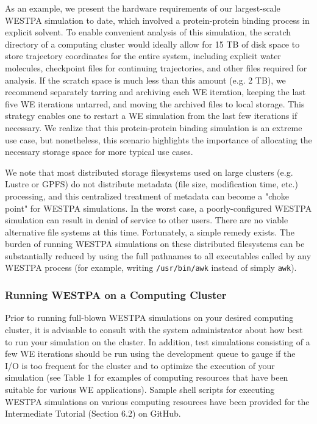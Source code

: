 \documentclass[9pt,tutorial,pubversion]{livecoms}
\begin{document}
As an example, we present the hardware requirements of our largest-scale WESTPA simulation to date, which involved a protein-protein binding process in explicit solvent. 
To enable convenient analysis of this simulation, the scratch directory of a computing cluster would ideally allow for 15 TB of disk space to store trajectory coordinates for the entire system, including explicit water molecules, checkpoint files for continuing trajectories, and other files required for analysis. 
If the scratch space is much less than this amount (e.g. 2 TB), we recommend separately tarring and archiving each WE iteration, keeping the last five WE iterations untarred, and moving the archived files to local storage. 
This strategy enables one to restart a WE simulation from the last few iterations if necessary. 
We realize that this protein-protein binding simulation is an extreme use case, but nonetheless, this scenario highlights the importance of allocating the necessary storage space for more typical use cases. 

We note that most distributed storage filesystems used on large clusters (e.g. Lustre or GPFS) do not distribute metadata (file size, modification time, etc.) processing, and this centralized treatment of metadata can become a "choke point" for WESTPA simulations. 
In the worst case, a poorly-configured WESTPA simulation can result in denial of service to other users. 
There are no viable alternative file systems at this time. 
Fortunately, a simple remedy exists. The burden of running WESTPA simulations on these distributed filesystems can be substantially reduced by using the full pathnames to all executables called by any WESTPA process (for example, writing \verb|/usr/bin/awk| instead of simply \verb|awk|).

\subsubsection{Running WESTPA on a Computing Cluster}

Prior to running full-blown WESTPA simulations on your desired computing cluster, it is advisable to consult with the system administrator about how best to run your simulation on the cluster. 
In addition, test simulations consisting of a few WE iterations should be run using the development queue to gauge if the I/O is too frequent for the cluster and to optimize the execution of your simulation (see Table 1 for examples of computing resources that have been suitable for various WE applications). 
Sample shell scripts for executing WESTPA simulations on various computing resources have been provided for the Intermediate Tutorial (Section 6.2) on GitHub. 
\end{document}

